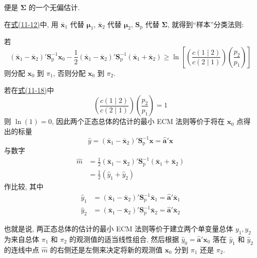 
便是 $\boldsymbol{\Sigma}$ 的一个无偏估计.

在\hyperref[eq:11-12]{式(11-12)}中, 用 $\bar{\mathbf{x}}_1$ 代替 $\boldsymbol{\mu}_1$, $\bar{\mathbf{x}}_2$ 代替 $\boldsymbol{\mu}_2$, $\mathbf{S}_{\mathrm{p}}$ 代替 $\boldsymbol{\Sigma}$, 就得到“样本”分类法则:

\begin{mvframe}
若
\label{eq:11-18}
\begin{equation}
(\bar{\mathbf{x}}_1-\bar{\mathbf{x}}_2)'\mathbf{S}_{\mathrm{p}}^{-1}\mathbf{x}_0-\frac{1}{2}(\bar{\mathbf{x}}_1-\bar{\mathbf{x}}_2)'\mathbf{S}_{\mathrm{p}}^{-1}(\bar{\mathbf{x}}_1+\bar{\mathbf{x}}_2)\geqslant\ln\left[\left(\frac{c(1\mid2)}{c(2\mid1)}\right)\left(\frac{p_2}{p_1}\right)\right]
\tag{11-18}
\end{equation}
则分配 $\mathbf{x}_0$ 到 $\pi_1$, 否则分配 $\mathbf{x}_0$ 到 $\pi_2$.
\end{mvframe}

若在\hyperref[eq:11-18]{式(11-18)}中
\[
\left(\frac{c(1\mid2)}{c(2\mid1)}\right)\left(\frac{p_2}{p_1}\right)=1
\]
则 $\ln(1)=0$, 因此两个正态总体的估计的最小 ECM 法则等价于将在 $\mathbf{x}_0$ 点得出的标量
\label{eq:11-19}
\begin{equation}
\hat{y}=(\bar{\mathbf{x}}_1-\bar{\mathbf{x}}_2)'\mathbf{S}_{\mathrm{p}}^{-1}\mathbf{x}=\hat{\mathbf{a}}'\mathbf{x}
\tag{11-19}
\end{equation}
与数字
\label{eq:11-20}
\begin{equation}
\begin{aligned}
\hat{m}&=\frac{1}{2}(\bar{\mathbf{x}}_1-\bar{\mathbf{x}}_2)'\mathbf{S}_{\mathrm{p}}^{-1}(\bar{\mathbf{x}}_1+\bar{\mathbf{x}}_2)\\
&=\frac{1}{2}(\hat{y}_1+\hat{y}_2)
\end{aligned}
\tag{11-20}
\end{equation}
作比较, 其中
\[
\begin{aligned}
\hat{y}_1&=(\bar{\mathbf{x}}_1-\bar{\mathbf{x}}_2)'\mathbf{S}_{\mathrm{p}}^{-1}\bar{\mathbf{x}}_1=\hat{\mathbf{a}}'\bar{\mathbf{x}}_1\\
\hat{y}_2&=(\bar{\mathbf{x}}_1-\bar{\mathbf{x}}_2)'\mathbf{S}_{\mathrm{p}}^{-1}\bar{\mathbf{x}}_2=\hat{\mathbf{a}}'\bar{\mathbf{x}}_2
\end{aligned}
\]

也就是说, 两正态总体的估计的最小 ECM 法则等价于建立两个单变量总体 $y_1, y_2$ 为来自总体 $\pi_1$ 和 $\pi_2$ 的观测值的适当线性组合, 然后根据 $\hat{y}_0=\hat{\mathbf{a}}'\mathbf{x}_0$ 落在 $\hat{y}_1$ 和 $\hat{y}_2$ 的连线中点 $\hat{m}$ 的右侧还是左侧来决定将新的观测值 $\mathbf{x}_0$ 分到 $\pi_1$ 还是 $\pi_2$.

